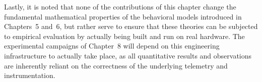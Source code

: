 Lastly, it is noted that none of the contributions of this chapter change the fundamental mathematical properties of the behavioral models introduced in Chapters~5 and~6, but rather serve to ensure that these theories can be subjected to empirical evaluation by actually being built and run on real hardware. The experimental campaigns of Chapter~8 will depend on this engineering infrastructure to actually take place, as all quantitative results and observations are inherently reliant on the correctness of the underlying telemetry and instrumentation.
